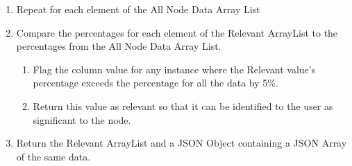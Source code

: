 \begin{enumerate}
  \item Repeat for each element of the All Node Data Array List
  \item Compare the percentages for each element of the Relevant ArrayList to
  the percentages from the All Node Data Array List.
  \begin{enumerate}
    \item Flag the column value for any instance where the Relevant value's
    percentage exceeds the percentage for all the data by 5\%.
    \item Return this value as relevant so that it can be identified to the user
    as significant to the node.
  \end{enumerate}
  \item Return the Relevant ArrayList and a JSON Object containing a JSON Array
  of the same data.
\end{enumerate}

